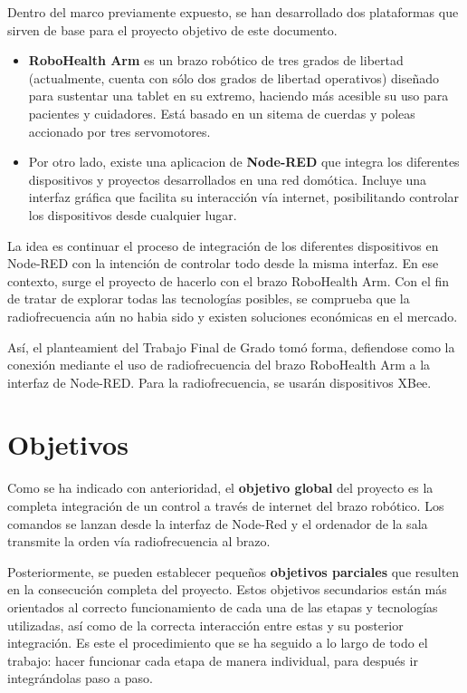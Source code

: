 Dentro del marco previamente expuesto, se han desarrollado dos plataformas que sirven de base para el proyecto objetivo de este documento.

\begin{itemize}
\item \textbf{RoboHealth Arm} es un brazo robótico de tres grados de libertad (actualmente, cuenta con sólo dos grados de libertad operativos) diseñado para sustentar una tablet en su extremo, haciendo más acesible su uso para pacientes y cuidadores. Está basado en un sitema de cuerdas y poleas accionado por tres servomotores.
\item Por otro lado, existe una aplicacion de \textbf{Node-RED} que integra los diferentes dispositivos y proyectos desarrollados en una red domótica. Incluye una interfaz gráfica que facilita su interacción vía internet, posibilitando controlar los dispositivos desde cualquier lugar.
\end{itemize} 

La idea es continuar el proceso de integración de los diferentes dispositivos en Node-RED con la intención de controlar todo desde la misma interfaz. En ese contexto, surge el proyecto de hacerlo con el brazo RoboHealth Arm. Con el fin de tratar de explorar todas las tecnologías posibles, se comprueba que la radiofrecuencia aún no habia sido y existen soluciones económicas en el mercado.

Así, el planteamient del Trabajo Final de Grado tomó forma, defiendose como la conexión mediante el uso de radiofrecuencia del brazo RoboHealth Arm a la interfaz de Node-RED. Para la radiofrecuencia, se usarán dispositivos XBee.

\section{Objetivos}

Como se ha indicado con anterioridad, el \textbf{objetivo global} del proyecto es la completa integración de un control a través de internet del brazo robótico. Los comandos se lanzan desde la interfaz de Node-Red y el ordenador de la sala transmite la orden vía radiofrecuencia al brazo.

Posteriormente, se pueden establecer pequeños \textbf{objetivos parciales} que resulten en la consecución completa del proyecto. Estos objetivos secundarios están más orientados al correcto funcionamiento de cada una de las etapas y tecnologías utilizadas, así como de la correcta interacción entre estas y su posterior integración. Es este el procedimiento que se ha seguido a lo largo de todo el trabajo: hacer funcionar cada etapa de manera individual, para después ir integrándolas paso a paso.

